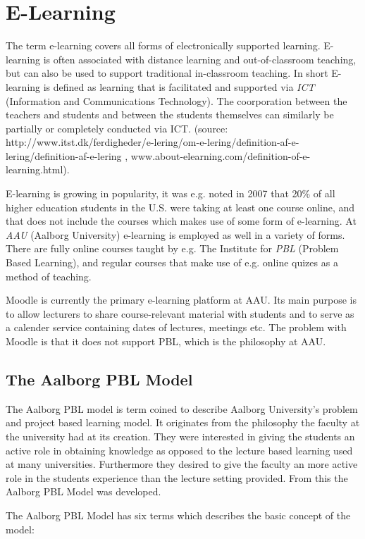 \section{E-Learning}
The term e-learning covers all forms of electronically supported learning. E-learning is often associated with distance learning and out-of-classroom teaching, but can also be used to support traditional in-classroom teaching. In short E-learning is defined as learning that is facilitated and supported via \emph{ICT} (Information and Communications Technology). The coorporation between the teachers and students and between the students themselves can similarly be partially or completely conducted via ICT. (source: http://www.itst.dk/ferdigheder/e-lering/om-e-lering/definition-af-e-lering/definition-af-e-lering , www.about-elearning.com/definition-of-e-learning.html).

E-learning is growing in popularity, it was e.g. noted in 2007 that 20\% of all higher education students in the U.S. were taking at least one course online, and that does not include the courses which makes use of some form of e-learning.	At \emph{AAU} (Aalborg University) e-learning is employed as well in a variety of forms. There are fully online courses taught by e.g. The Institute for \emph{PBL} (Problem Based Learning), and regular courses that make use of e.g. online quizes as a method of teaching. 

Moodle is currently the primary e-learning platform at AAU. Its main purpose is to allow lecturers to share course-relevant material with students and to serve as a calender service containing dates of lectures, meetings etc. The problem with Moodle is that it does not support PBL, which is the philosophy at AAU.

\subsection{The Aalborg PBL Model}
The Aalborg PBL model is term coined to describe Aalborg University's problem and project based learning model. It originates from the philosophy the faculty at the university had at its creation. They were interested in giving the students an active role in obtaining knowledge as opposed to the lecture based learning used at many universities. Furthermore they desired to give the faculty an more active role in the students experience than the lecture setting provided. From this the Aalborg PBL Model was developed.

The Aalborg PBL Model has six terms which describes the basic concept of the model:

